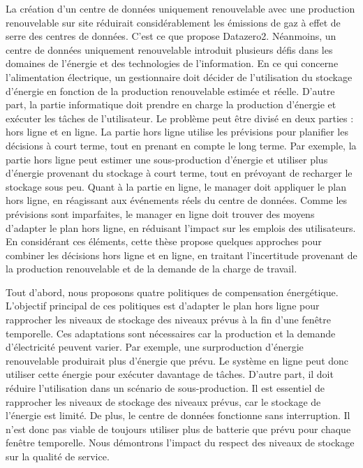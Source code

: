 La création d'un centre de données uniquement renouvelable avec une production renouvelable sur site réduirait considérablement les émissions de gaz à effet de serre des centres de données. C'est ce que propose Datazero2. Néanmoins, un centre de données uniquement renouvelable introduit plusieurs défis dans les domaines de l'énergie et des technologies de l'information. En ce qui concerne l'alimentation électrique, un gestionnaire doit décider de l'utilisation du stockage d'énergie en fonction de la production renouvelable estimée et réelle. D'autre part, la partie informatique doit prendre en charge la production d'énergie et exécuter les tâches de l'utilisateur. Le problème peut être divisé en deux parties : hors ligne et en ligne. La partie hors ligne utilise les prévisions pour planifier les décisions à court terme, tout en prenant en compte le long terme. Par exemple, la partie hors ligne peut estimer une sous-production d'énergie et utiliser plus d'énergie provenant du stockage à court terme, tout en prévoyant de recharger le stockage sous peu. Quant à la partie en ligne, le manager doit appliquer le plan hors ligne, en réagissant aux événements réels du centre de données. Comme les prévisions sont imparfaites, le manager en ligne doit trouver des moyens d'adapter le plan hors ligne, en réduisant l'impact sur les emplois des utilisateurs. En considérant ces éléments, cette thèse propose quelques approches pour combiner les décisions hors ligne et en ligne, en traitant l'incertitude provenant de la production renouvelable et de la demande de la charge de travail.

Tout d'abord, nous proposons quatre politiques de compensation énergétique. L'objectif principal de ces politiques est d'adapter le plan hors ligne pour rapprocher les niveaux de stockage des niveaux prévus à la fin d'une fenêtre temporelle. Ces adaptations sont nécessaires car la production et la demande d'électricité peuvent varier. Par exemple, une surproduction d'énergie renouvelable produirait plus d'énergie que prévu. Le système en ligne peut donc utiliser cette énergie pour exécuter davantage de tâches. D'autre part, il doit réduire l'utilisation dans un scénario de sous-production. Il est essentiel de rapprocher les niveaux de stockage des niveaux prévus, car le stockage de l'énergie est limité. De plus, le centre de données fonctionne sans interruption. Il n'est donc pas viable de toujours utiliser plus de batterie que prévu pour chaque fenêtre temporelle. Nous démontrons l'impact du respect des niveaux de stockage sur la qualité de service. 


